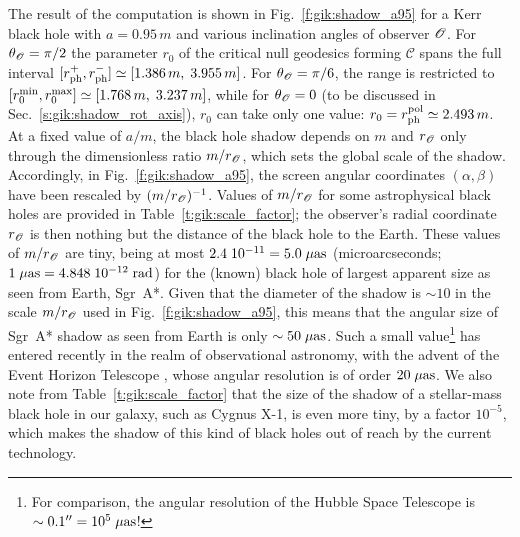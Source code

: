 The result of the computation is shown in
Fig.~\ref{f:gik:shadow_a95} for a Kerr black hole with
$a=0.95\, m$ and various inclination angles of observer $\mathscr{O}$.
For $\theta_{\mathscr{O}}=\pi/2$ the parameter $r_0$ of the critical null geodesics
forming $\mathscr{C}$ spans the full interval
$[r_{\rm ph}^+, r_{\rm ph}^-] \simeq [1.386\, m,\; 3.955\, m]$.
For $\theta_{\mathscr{O}}=\pi/6$, the range is restricted to
$[r_0^{\rm min}, r_0^{\rm max}] \simeq [1.768\, m,\;   3.237\, m]$,
while for $\theta_{\mathscr{O}}=0$ (to be discussed in Sec.~\ref{s:gik:shadow_rot_axis}),
$r_0$ can take only one value:
$r_0 = r_{\rm ph}^{\rm pol} \simeq 2.493\, m$.
At a fixed value of $a/m$, the black hole shadow depends on $m$ and $r_{\mathscr{O}}$
only through the dimensionless ratio $m/r_{\mathscr{O}}$, which sets the global scale of the shadow.
Accordingly, in Fig.~\ref{f:gik:shadow_a95}, the screen angular coordinates $(\alpha,\beta)$ have
been rescaled by $(m/r_{\mathscr{O}})^{-1}$.
Values of $m/r_{\mathscr{O}}$ for some astrophysical black holes are provided
in Table~\ref{t:gik:scale_factor}; the observer's radial coordinate $r_{\mathscr{O}}$ is then
nothing but the distance of the black hole to the Earth. These values of
$m/r_{\mathscr{O}}$ are tiny, being at most $2.4\; 10^{-11} = 5.0 \; \mu{\rm as}$
(microarcseconds; $1\; \mu{\rm as} = 4.848\; 10^{-12}\; {\rm rad}$)
for
the (known) black hole of largest apparent size as seen from Earth, Sgr~A*.
Given that the diameter of the shadow is $\sim 10$ in the scale
$m/r_{\mathscr{O}}$ used in Fig.~\ref{f:gik:shadow_a95}, this means that the
angular size of Sgr~A* shadow as seen from Earth is only $\sim 50\; \mu{\rm as}$.
Such a small value\footnote{For comparison, the angular resolution of the
Hubble Space Telescope is $\sim 0.1'' = 10^5\; \mu{\rm as}$!}
has entered recently in the realm of observational astronomy,
with the advent of the Event Horizon Telescope \cite{EHT19a},
whose angular resolution is of order $20\; \mu{\rm as}$.
We also note from Table~\ref{t:gik:scale_factor} that the size of the shadow
of a stellar-mass black hole in our galaxy, such as Cygnus X-1, is even more tiny,
by a factor $10^{-5}$, which makes the shadow of this kind of black holes out of reach
by the current technology.

